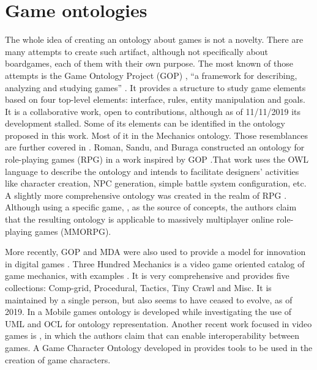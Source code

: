 \section{Game ontologies}

The whole idea of creating an ontology about games is not a novelty. There are many attempts to create such artifact, although not specifically about boardgames, each of them with their own purpose. The most known of those attempts is the Game Ontology Project (GOP) \citep{wiki:gop}, “a framework for describing, analyzing and studying games” \citep{Zagal:2008:GOP}. It  provides  a  structure  to  study  game  elements  based  on four top-level elements:  interface,  rules,  entity manipulation and goals. It  is  a  collaborative  work,  open  to  contributions, although as of 11/11/2019 its development stalled. Some of its elements can be identified in the ontology proposed in this work. Most of it in the Mechanics ontology. Those resemblances are further covered in \citep{kritz_buildingOntology}. Roman,  Sandu,  and  Buraga  constructed  an  ontology  for  role-playing games (RPG) in a work inspired by GOP \citep{roman2011owl}.That work uses the OWL language to describe the ontology and intends to facilitate designers’ activities like character creation, NPC generation, simple battle system configuration, etc. A slightly more comprehensive  ontology was created in the realm of RPG \citep{dhuric2015specific}. Although  using  a  specific  game,  \cite{manaworld}, as the source of concepts, the authors claim that the resulting ontology is applicable to massively multiplayer online role-playing games (MMORPG).

More recently, GOP and MDA were also used to provide a model for innovation in digital games \citep{innov:gop:mda}. Three Hundred Mechanics is a video game oriented catalog of game mechanics, with examples \citep{300gm}. It is very comprehensive and provides five collections: Comp-grid, Procedural, Tactics, Tiny Crawl and Misc. It is maintained by a single person, but also seems to have ceased to evolve, as of 2019. In \cite{leon_z._ontology_2010} a Mobile games ontology is developed while investigating the use of UML and OCL for ontology representation. Another recent work focused in video games is \cite{parkkila_ontology_2017}, in which the authors claim that can enable interoperability between games. A Game Character Ontology developed in \cite{sacco_game_2017} provides tools to be used in the creation of game characters.

